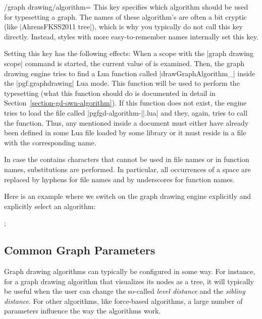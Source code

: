 \begin{key}{/graph drawing/algorithm=}
  \label{section-gd-algorithm-key}%
  This key specifies which algorithm should be used for typesetting a
  graph. The names of these algorithm's are often a bit cryptic (like
  |AhrensFKSS2011 tree|), which is why you typically do not call this
  key directly. Instead, styles with more easy-to-remember names
  internally set this key.

  Setting this key has the following effects: When a scope with the
  |graph drawing scope| command is started, the current value of
   is examined. Then, the graph drawing engine
  tries to find a Lua function called
  |drawGraphAlgorithm_| inside the
  |pgf.graphdrawing| Lua mode. This function will be used to
  perform the typesetting (what this function should do is documented
  in detail in Section~\ref{section-gd-own-algorithm}). If this
  function does not exist, the engine tries to load the file 
  called |pgfgd-algorithm-||.lua| and they,
  again, tries to call the function. Thus, any 
  mentioned inside a document must either have already been defined in
  some Lua file loaded by some library or it must reside in a file
  with the corresponding name.
  
  In case the  contains characters that cannot
  be used in file names or in function names, substitutions are
  performed. In particular, all occurrences of a space are replaced by
  hyphens for file names and by underscores for function names.

  Here is an example where we switch on the graph drawing engine
  explicitly and explicitly select an algorithm:
\begin{codeexample}[]
\tikz [graph drawing scope,
       /graph drawing/algorithm=AhrensFKSS2011 tree]
  ;  
\end{codeexample}
\end{key}


\subsection{Common Graph Parameters}

Graph drawing algorithms can typically be configured in some way. For
instance, for a graph drawing algorithm that visualizes its nodes as a
tree, it will typically be useful when the user can change the
so-called \emph{level distance} and the \emph{sibling distance}. For
other algorithms, like force-based algorithms, a large number of
parameters influence the way the algorithms work.

